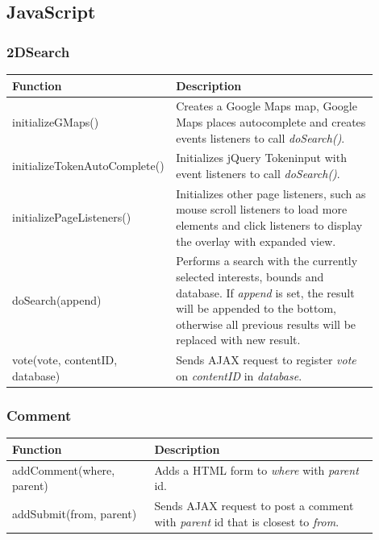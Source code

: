 \subsection{JavaScript}
\label{subsec:CodeDetailsJavaScript}

\subsubsection{2DSearch}
\begin{minipage}{\linewidth}
  \centering
  \setlength{\tabcolsep}{12pt}
  \begin{tabular}{|p{0.35\linewidth}|p{0.55\linewidth}|}
  \hline
  \cellcolor{gray!25} Function & \cellcolor{gray!25} Description \\
  \hline
  initializeGMaps() & Creates a Google Maps map, Google Maps places autocomplete and creates events listeners to call \textit{doSearch()}. \\
  initializeTokenAutoComplete() & Initializes jQuery Tokeninput with event listeners to call \textit{doSearch()}. \\
  initializePageListeners() & Initializes other page listeners, such as mouse scroll listeners to load more elements and click listeners to display the overlay with expanded view. \\
  doSearch(append) & Performs a search with the currently selected interests, bounds and database. If \textit{append} is set, the result will be appended to the bottom, otherwise all previous results will be replaced with new result. \\
  vote(vote, contentID, database) & Sends AJAX request to register \textit{vote} on \textit{contentID} in \textit{database}. \\
  \hline
  \end{tabular}
\end{minipage}

\subsubsection{Comment}
\begin{minipage}{\linewidth}
  \centering
  \setlength{\tabcolsep}{12pt}
  \begin{tabular}{|p{0.35\linewidth}|p{0.55\linewidth}|}
  \hline
  \cellcolor{gray!25} Function & \cellcolor{gray!25} Description \\
  \hline
  addComment(where, parent) & Adds a HTML form to \textit{where} with \textit{parent} id. \\
  addSubmit(from, parent) & Sends AJAX request to post a comment with \textit{parent} id that is closest to \textit{from}. \\
  \hline
  \end{tabular}
\end{minipage}

